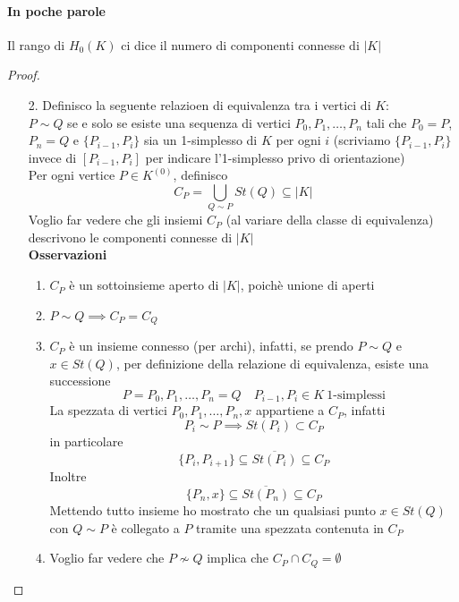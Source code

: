 \documentclass[a4paper]{report}
\newcommand{\pskel}[2]{\ensuremath{{#1}^{({#2})}}}
\begin{document}
\paragraph{In poche parole} Il rango di $H_0(K)$ ci dice il numero di componenti connesse di $|K|$
\begin{proof}
    \begin{enumerate}
        \item[2.] Definisco la seguente relazioen di equivalenza tra i vertici di $K$:\\
            $P\sim Q$ se e solo se esiste una sequenza di vertici $P_0,P_1,\dots,P_n$ tali che $P_0=P$, $P_n=Q$ e $\{P_{i-1},P_i\}$ sia un 1-simplesso di $K$ per ogni $i$ (scriviamo $\{P_{i-1},P_i\}$ invece di $[P_{i-1},P_i]$ per indicare l'1-simplesso privo di orientazione)\\
            Per ogni vertice $P\in\pskel{K}{0}$, definisco
            \[
                C_P=\bigcup_{Q\sim P}St(Q)\subseteq |K|
            \]
            Voglio far vedere che gli insiemi $C_P$ (al variare della classe di equivalenza) descrivono le componenti connesse di $|K|$\\
            \textbf{Osservazioni}
            \begin{enumerate}
                \item $C_P$ è un sottoinsieme aperto di $|K|$, poichè unione di aperti
                \item $P\sim Q\implies C_P=C_Q$
                \item $C_P$ è un insieme connesso (per archi), infatti, se prendo $P\sim Q$ e $x\in St(Q)$, per definizione della relazione di equivalenza, esiste una successione
                      \[
                          P=P_0,P_1,\dots,P_n=Q\quad {P_{i-1},P_i}\in K\ \text{1-simplessi}
                      \]
                      La spezzata di vertici $P_0,P_1,\dots,P_n,x$ appartiene a $C_P$, infatti
                      \[
                          P_i\sim P\implies St(P_i)\subset C_P
                      \]
                      in particolare
                      \[
                          \{P_i,P_{i+1}\}\subseteq\overline{St(P_i)}\subseteq C_P
                      \]
                      Inoltre
                      \[
                          \{P_n,x\}\subseteq\overline{St(P_n)}\subseteq C_P
                      \]
                      Mettendo tutto insieme ho mostrato che un qualsiasi punto $x\in St(Q)$ con $Q\sim P$ è collegato a $P$ tramite una spezzata contenuta in $C_P$
                \item Voglio far vedere che $P\nsim Q$ implica che $C_P\cap C_Q=\emptyset$\\

\end{enumerate}
\end{enumerate}
\end{proof}
\end{document}
